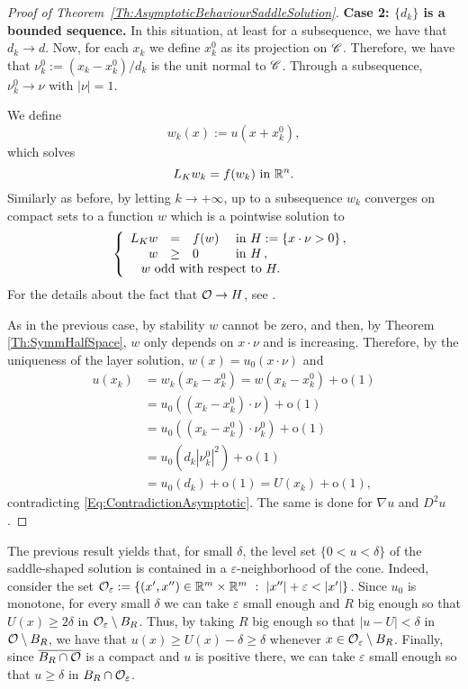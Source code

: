 \begin{proof}[Proof of Theorem~\ref{Th:AsymptoticBehaviourSaddleSolution}]
\textbf{Case 2: $\{d_k\}$ is a bounded sequence.}
In this situation, at least for a subsequence, we have that $d_k \rightarrow d$. Now, for each $x_k$ we define $x_k^0$ as its projection on $\mathscr{C}$. Therefore, we have that $ \nu_k^0 := (x_k-x_k^0)/d_k$ is the unit normal to $\mathscr{C}$. Through a subsequence, $ \nu_k^0 \rightarrow \nu$ with $|\nu|=1$.

We define
$$ w_k (x) := u(x+x_k^0), $$
which solves
$$ L_K  w_k = f(w_k) \ \text{in } \mathbb{R}^n. $$
Similarly as before, by letting $k\to +\infty$, up to a subsequence $w_k$ converges on compact sets to a function $w$ which is a pointwise solution to
$$
\beqc{\PDEsystem}
L_K  w &=& f(w)  &\textrm{ in } H:=\{x\cdot \nu >0\}\,,\\
w &\geq& 0  &\textrm{ in } H\,,\\
\,\,w \text{ odd with respect to } H. \span\span\span \,
\eeqc
$$
For the details about the fact that $\mathcal{O} \rightarrow H$, see \cite{CabreTerraI}.

As in the previous case, by stability $w$ cannot be zero, and then, by Theorem \ref{Th:SymmHalfSpace}, $w$ only depends on $x\cdot \nu$ and is increasing. Therefore, by the uniqueness of the layer solution, $w(x) = u_0(x\cdot \nu)$ and
\begin{align*}
u(x_k) &= w_k(x_k-x_k^0) = w(x_k-x_k^0) + \mathrm{o}(1) \\
&= u_0((x_k-x_k^0)\cdot \nu) + \mathrm{o}(1) \\
&= u_0((x_k-x_k^0)\cdot \nu_k^0) + \mathrm{o}(1) \\
&= u_0(d_k |\nu_k^0|^2) + \mathrm{o}(1) \\
&= u_0(d_k) + \mathrm{o}(1) = U (x_k) + \mathrm{o}(1),
\end{align*}
contradicting \eqref{Eq:ContradictionAsymptotic}. The same is done for $\nabla u$ and $D^2 u$.
\end{proof}

\begin{remark}
	\label{Remark:u>delta}
	The previous result yields that, for small $\delta$, the level set $\{0<u<\delta\}$ of the saddle-shaped solution is contained in a $\varepsilon$-neighborhood of the cone. Indeed, consider the set $\ocal_\varepsilon := \{(x',x'')\in \R^m\times\R^m \ : \ |x''|+\varepsilon <|x'| \}$. Since $u_0$ is monotone, for every small $\delta$ we can take $\varepsilon$ small enough and $R$ big enough so that $U(x)\geq 2\delta$ in $\mathcal{O}_\varepsilon \setminus B_R$. Thus, by taking $R$ big enough so that $|u-U|< \delta$ in $\mathcal{O} \setminus B_R$, we have that $u(x) \geq U(x)-\delta \geq \delta$ whenever $x\in \mathcal{O}_\varepsilon \setminus B_R$. Finally, since $\overline{B_R \cap \mathcal{O}}$ is a compact and $u$ is positive there, we can take $\varepsilon$ small enough so that $u\geq \delta$ in $B_R\cap \mathcal{O}_\varepsilon$.
\end{remark}